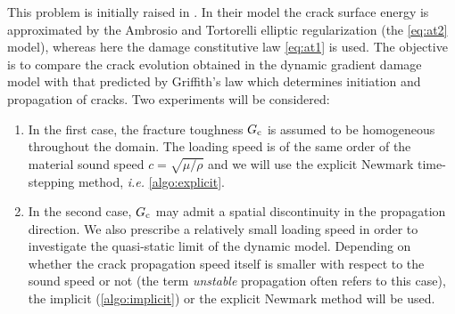 This problem is initially raised in \cite{Bourdin:2011}. In their model the crack surface energy is approximated by the Ambrosio and Tortorelli elliptic regularization (the \eqref{eq:at2} model), whereas here the damage constitutive law \eqref{eq:at1} is used. The objective is to compare the crack evolution obtained in the dynamic gradient damage model with that predicted by Griffith's law which determines initiation and propagation of cracks. Two experiments will be considered:
\begin{enumerate}
\item In the first case, the fracture toughness $G_\mathrm{c}$ is assumed to be homogeneous throughout the domain. The loading speed is of the same order of the material sound speed $c=\sqrt{\mu/\rho}$ and we will use the explicit Newmark time-stepping method, \emph{i.e.} \cref{algo:explicit}.

\item In the second case, $G_\mathrm{c}$ may admit a spatial discontinuity in the propagation direction. We also prescribe a relatively small loading speed in order to investigate the quasi-static limit of the dynamic model. Depending on whether the crack propagation speed itself is smaller with respect to the sound speed or not (the term \emph{unstable} propagation often refers to this case), the implicit (\cref{algo:implicit}) or the explicit Newmark method will be used.
\end{enumerate}

